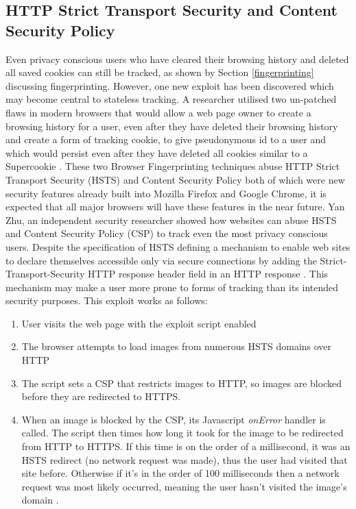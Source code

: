 \documentclass{article}
\begin{document}
\subsection{HTTP Strict Transport Security and Content Security Policy}
Even privacy conscious users who have cleared their browsing history and deleted all saved cookies can still be tracked, as shown by Section \ref{fingerprinting} discussing fingerprinting. However, one new exploit has been discovered which may become central to stateless tracking. A researcher utilised two un-patched flaws in modern browsers that would allow a web page owner to create a browsing history for a user, even after they have deleted their browsing history and create a form of tracking cookie, to give pseudonymous id to a user and which would persist even after they have deleted all cookies similar to a Supercookie \parencite{newTracking}. These two Browser Fingerprinting techniques abuse HTTP Strict Transport Security (HSTS) and Content Security Policy both of which were new security features already built into Mozilla Firefox and Google Chrome, it is expected that all major browsers will have these features in the near future. Yan Zhu, an independent security researcher showed how websites can abuse HSTS and Content Security Policy (CSP) to track even the most privacy conscious users. Despite the specification of HSTS defining a mechanism to enable web sites to declare themselves accessible only via secure connections by adding the Strict-Transport-Security HTTP response header field in an HTTP response \parencite{HSTS}. This mechanism may make a user more prone to forms of tracking than its intended security purposes. This exploit works as follows: 

\begin{enumerate}
    \item User visits the web page with the exploit script enabled
    \item The browser attempts to load images from numerous HSTS domains over HTTP
    \item The script sets a CSP that restricts images to HTTP, so images are blocked before they are redirected to HTTPS. 
    \item When an image is blocked by the CSP, its Javascript \textit{onError} handler is called. The script then times how long it took for the image to be redirected from HTTP to HTTPS. If this time is on the order of a millisecond, it was an HSTS redirect (no network request was made), thus the user had visited that site before. Otherwise if it's in the order of 100 milliseconds then a network request was most likely occurred, meaning the user hasn't visited the image's domain \parencite{gitSniffly}. 
\end{enumerate} 
\end{document}
